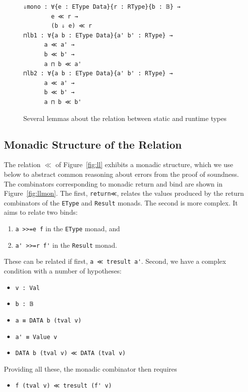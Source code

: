 \documentclass[acmsmall,screen,review]{acmart}
\begin{document}
\begin{figure}
\begin{verbatim}  
⇓mono : ∀{e : EType Data}{r : RType}{b : 𝔹} →
        e ≪ r →
        (b ⇓ e) ≪ r
⊓lb1 : ∀{a b : EType Data}{a' b' : RType} →
      a ≪ a' →
      b ≪ b' →
      a ⊓ b ≪ a'
⊓lb2 : ∀{a b : EType Data}{a' b' : RType} →
      a ≪ a' →
      b ≪ b' →
      a ⊓ b ≪ b'
\end{verbatim}  
\caption{Several lemmas about the relation between static and runtime types}
\label{fig:lllem}
\end{figure}  

\subsection{Monadic Structure of the Relation}

The relation $\ll$ of Figure~\ref{fig:ll} exhibits a monadic structure, which we use below
to abstract common reasoning about errors from the proof of soundness.  The combinators corresponding
to monadic return and bind are shown in Figure~\ref{fig:llmon}.  The first, \verb|return≪|,
relates the values produced by the return combinators of the \verb|EType| and \verb|Result|
monads.  The second is more complex.  It aims to relate two binds:
\begin{enumerate}
\item \verb|a >>=e f| in the \verb|EType| monad, and
\item \verb|a' >>=r f'| in the \verb|Result| monad.
\end{enumerate}

\noindent These can be related if first, \verb|a ≪ tresult a'|.  Second,
we have a complex condition with a number of hypotheses:

\begin{itemize}
\item \verb|v : Val|
\item \verb|b : 𝔹|
\item \verb|a ≡ DATA b (tval v)|
\item \verb|a' ≡ Value v|
\item \verb|DATA b (tval v) ≪ DATA (tval v)|
\end{itemize}  

\noindent Providing all these, the monadic combinator then requires

\begin{itemize}
\item \verb|f (tval v) ≪ tresult (f' v)|
  \end{itemize}
\end{document}
